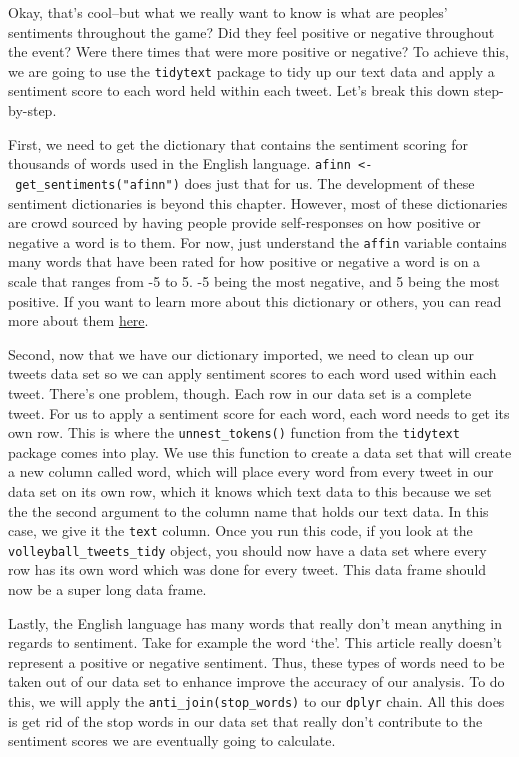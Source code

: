 \documentclass[]{book}
\begin{document}
Okay, that's cool--but what we really want to know is what are peoples' sentiments throughout the game? Did they feel positive or negative throughout the event? Were there times that were more positive or negative? To achieve this, we are going to use the \texttt{tidytext} package to tidy up our text data and apply a sentiment score to each word held within each tweet. Let's break this down step-by-step.

First, we need to get the dictionary that contains the sentiment scoring for thousands of words used in the English language. \texttt{afinn\ \textless{}-\ get\_sentiments("afinn")} does just that for us. The development of these sentiment dictionaries is beyond this chapter. However, most of these dictionaries are crowd sourced by having people provide self-responses on how positive or negative a word is to them. For now, just understand the \texttt{affin} variable contains many words that have been rated for how positive or negative a word is on a scale that ranges from -5 to 5. -5 being the most negative, and 5 being the most positive. If you want to learn more about this dictionary or others, you can read more about them \href{https://www.tidytextmining.com/sentiment.html}{here}.

Second, now that we have our dictionary imported, we need to clean up our tweets data set so we can apply sentiment scores to each word used within each tweet. There's one problem, though. Each row in our data set is a complete tweet. For us to apply a sentiment score for each word, each word needs to get its own row. This is where the \texttt{unnest\_tokens()} function from the \texttt{tidytext} package comes into play. We use this function to create a data set that will create a new column called word, which will place every word from every tweet in our data set on its own row, which it knows which text data to this because we set the the second argument to the column name that holds our text data. In this case, we give it the \texttt{text} column. Once you run this code, if you look at the \texttt{volleyball\_tweets\_tidy} object, you should now have a data set where every row has its own word which was done for every tweet. This data frame should now be a super long data frame.

Lastly, the English language has many words that really don't mean anything in regards to sentiment. Take for example the word `the'. This article really doesn't represent a positive or negative sentiment. Thus, these types of words need to be taken out of our data set to enhance improve the accuracy of our analysis. To do this, we will apply the \texttt{anti\_join(stop\_words)} to our \texttt{dplyr} chain. All this does is get rid of the stop words in our data set that really don't contribute to the sentiment scores we are eventually going to calculate.
\end{document}
